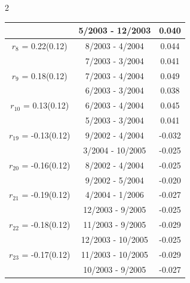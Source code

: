 \begin{multicols}{2}
{\begin{tabular}{ccc}
&        5/2003 - 12/2003 &        0.040  \vspace{-.02in} \\ \hline 
  $r_{ 8}$ = 0.22(0.12) &       8/2003 -  4/2004 &        0.044   \vspace{-.10in} \\  
&        7/2003 -  3/2004 &        0.041  \vspace{-.02in} \\ \hline 
  $r_{ 9}$ = 0.18(0.12) &       7/2003 -  4/2004 &        0.049   \vspace{-.10in} \\  
&        6/2003 -  3/2004 &        0.038  \vspace{-.02in} \\ \hline 
  $r_{10}$ = 0.13(0.12) &       6/2003 -  4/2004 &        0.045   \vspace{-.10in} \\  
&        5/2003 -  3/2004 &        0.041  \vspace{-.02in} \\ \hline 
  $r_{19}$ = -0.13(0.12) &       9/2002 -  4/2004 &       -0.032    \vspace{-.10in} \\ 
  &        3/2004 - 10/2005 &       -0.025  \vspace{-.02in}   \\ \hline 
    $r_{20}$ = -0.16(0.12) &       8/2002 -  4/2004 &       -0.025    \vspace{-.10in} \\ 
  &        9/2002 -  5/2004 &       -0.020  \vspace{-.02in}   \\ \hline 
    $r_{21}$ = -0.19(0.12) &       4/2004 -  1/2006 &       -0.027    \vspace{-.10in} \\ 
  &       12/2003 -  9/2005 &       -0.025  \vspace{-.02in}   \\ \hline 
    $r_{22}$ = -0.18(0.12) &      11/2003 -  9/2005 &       -0.029    \vspace{-.10in} \\ 
  &       12/2003 - 10/2005 &       -0.025  \vspace{-.02in}   \\ \hline 
    $r_{23}$ = -0.17(0.12) &      11/2003 - 10/2005 &       -0.029    \vspace{-.10in} \\ 
  &       10/2003 -  9/2005 &       -0.027  \vspace{-.02in}   \\ \hline 

\end{tabular}}
\end{multicols}
